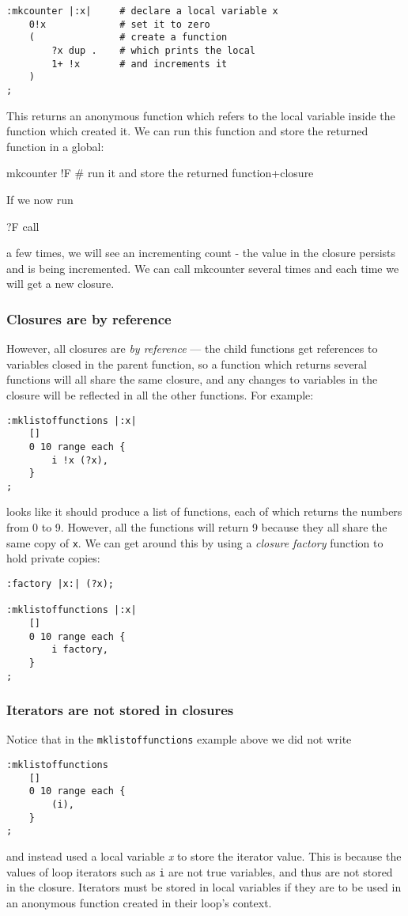 \begin{lstlisting}
:mkcounter |:x|     # declare a local variable x
    0!x             # set it to zero
    (               # create a function
        ?x dup .    # which prints the local
        1+ !x       # and increments it
    )
;
\end{lstlisting}
This returns an anonymous function which refers to the local variable
inside the function which created it. We can run this function
and store the returned function in a global:

\begin{v}
mkcounter !F    # run it and store the returned function+closure
\end{v}
If we now run
\begin{v}
    ?F call
\end{v}
a few times, we will see an incrementing count - the value in the closure
persists and is being incremented. We can call mkcounter several times and
each time we will get a new closure.

\subsubsection{Closures are by reference}
However, all closures are \emph{by reference} --- the child functions
get references to variables closed in the parent function, so a function
which returns several functions will all share the same closure, and
any changes to variables in the closure will be reflected in all the 
other functions. For example:
\begin{lstlisting}
:mklistoffunctions |:x|
    []
    0 10 range each {
        i !x (?x),
    }
;
\end{lstlisting}
looks like it should produce a list of functions, each of which
returns the numbers from 0 to 9. However, all the functions will
return 9 because they all share the same copy of \texttt{x}.
We can get around this by using a \emph{closure factory} function to hold
private copies:
\begin{lstlisting}
:factory |x:| (?x);

:mklistoffunctions |:x|
    []
    0 10 range each {
        i factory,
    }
;

\end{lstlisting}

\subsubsection{Iterators are not stored in closures}
Notice that in the \texttt{mklistoffunctions} example above we did not write
\begin{lstlisting}
:mklistoffunctions
    []
    0 10 range each {
        (i),
    }
;
\end{lstlisting}
and instead used a local variable \emph{x} to store the iterator value. This is because
the values of loop iterators such as \texttt{i} are not true variables, and thus are not
stored in the closure. Iterators must be stored in local variables if they are to be used
in an anonymous function created in their loop's context.

